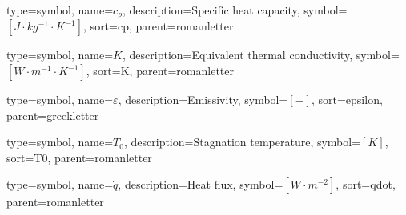 {
	type=symbol, %
	name={\ensuremath{c_p}}, %
	description={Specific heat capacity}, %
	symbol={$\left[J\cdot kg^{-1}\cdot K^{-1}\right]$}, %
	sort=cp, %
	parent=romanletter %
}

{
	type=symbol, %
	name={\ensuremath{K}}, %
	description={Equivalent thermal conductivity}, %
	symbol={$\left[W\cdot m^{-1}\cdot K^{-1}\right]$}, %
	sort=K, %
	parent=romanletter %
}

{
	type=symbol, %
	name={\ensuremath{\varepsilon}}, %
	description={Emissivity}, %
	symbol={$\left[-\right]$}, %
	sort=epsilon, %
	parent=greekletter %
}

{
	type=symbol, %
	name={\ensuremath{T_0}}, %
	description={Stagnation temperature}, %
	symbol={$\left[K\right]$}, %
	sort=T0, %
	parent=romanletter %
}
	
{
	type=symbol, %
	name={\ensuremath{\dot{q}}}, %
	description={Heat flux}, %
	symbol={$\left[W\cdot m^{-2} \right]$}, %
	sort=qdot, %
	parent=romanletter %
}

